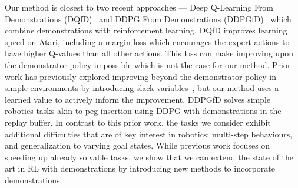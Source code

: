 Our method is closest to two recent approaches --- Deep Q-Learning From Demonstrations (DQfD)~\citep{hester17dqfd} and DDPG From Demonstrations (DDPGfD)~\citep{vecerik17ddpgfd} which combine demonstrations with reinforcement learning. DQfD improves learning speed on Atari, including a margin loss which encourages the expert actions to have higher Q-values than all other actions. This loss can make improving upon the demonstrator policy impossible which is not the case for our method. Prior work has previously explored improving beyond the demonstrator policy in simple environments by introducing slack variables~\citep{kim2013apid}, but our method uses a learned value to actively inform the improvement. DDPGfD solves simple robotics tasks akin to peg insertion using DDPG with demonstrations in the replay buffer. In contrast to this prior work, the tasks we consider exhibit additional difficulties that are of key interest in robotics: multi-step behaviours, and generalization to varying goal states.
While previous work focuses on speeding up already solvable tasks, we show that we can extend the state of the art in RL with demonstrations by introducing new methods to incorporate demonstrations.